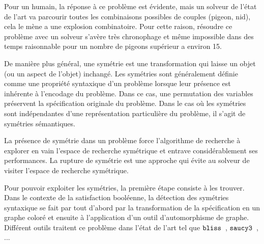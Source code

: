  
Pour un humain, la réponse à ce problème est évidente, mais un solveur de l'état de l'art va parcourir toutes 
les combinaisons possibles de couples (pigeon, nid), cela le mène a une explosion combinatoire.
Pour cette raison, résoudre ce problème avec un solveur s'avère très chronophage et même impossible dans des temps raisonnable
pour un nombre de pigeons supérieur a environ 15.

%
%

De manière plus  général, une symétrie est une transformation qui laisse un objet (ou un aspect de l'objet) inchangé. Les symétries sont généralement définie comme une propriété syntaxique d'un problème lorsque leur présence est inhérente à l'encodage du problème.
Dans ce cas, une permutation des variables préservent la spécification originale du problème.
Dans le cas où les symétries sont indépendantes d'une représentation particulière du problème, il s'agit de symétries sémantiques.

La présence de symétrie dans un problème force l'algorithme de recherche à explorer en vain l'espace de recherche symétrique et entrave considérablement ses performances. La rupture de symétrie est une approche qui évite au solveur de visiter l'espace de recherche symétrique.

Pour pouvoir exploiter les symétries, la première étape consiste à les trouver. Dans le contexte de la satisfaction booléenne, la détection des symétries syntaxique se fait par tout d'abord par la transformation de la spécification en un graphe coloré et ensuite à l'application d'un outil d'automorphisme de graphe.
Différent outils traitent ce problème dans l'état de l'art tel que $\texttt{bliss}$~\cite{JunttilaKaski:ALENEX2007}, $\texttt{saucy3}$~\cite{katebi2010symmetry}, ...



